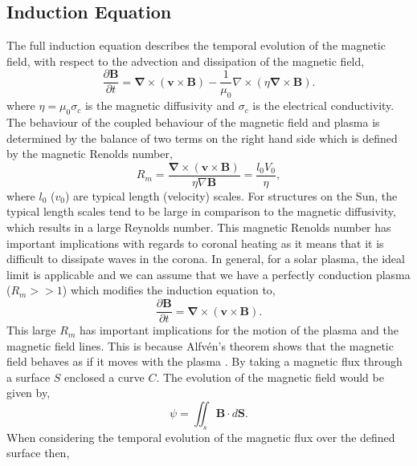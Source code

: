 \documentclass[12pt]{ociamthesis}
\newcommand{\bs}[1]{\boldsymbol{#1}}
\newcommand{\bn}{\boldsymbol{\nabla}}
\begin{document}
\subsection{Induction Equation}
\label{section:cont_eq}
The full induction equation describes the temporal evolution of the magnetic field, with respect to the advection and dissipation of the magnetic field,
\begin{equation}\label{eq89}
\frac{\partial \boldsymbol{B}}{\partial t} = \bn \times (\boldsymbol{v} \times \boldsymbol{B}) - \frac{1}{\mu_0} \nabla \times (\eta \bn \times \boldsymbol{B}).
\end{equation}
where $\eta= \mu_0 \sigma_c$ is the magnetic diffusivity and $\sigma_c$ is the electrical conductivity. The behaviour of the coupled behaviour of the magnetic field and plasma is determined by the balance of two terms on the right hand side which is defined by the magnetic Renolds number,
\begin{equation}
    R_m = \frac{\bn \times (\boldsymbol{v} \times \boldsymbol{B})}{\eta \nabla \bs{B}}=\frac{l_0 V_0}{\eta},
\end{equation}
where $l_0$ ($v_0$) are typical length (velocity) scales. For structures on the Sun, the typical length scales tend to be large in comparison to the magnetic diffusivity, which results in a large Reynolds number. This magnetic Renolds number has important implications with regards to coronal heating as it means that it is difficult to dissipate waves in the corona. In general, for a solar plasma, the ideal limit is applicable and we can assume that we have a perfectly conduction plasma ($R_m>>1$) which modifies the induction equation to,
\begin{equation}\label{perf_induct}
\frac{\partial \boldsymbol{B}}{\partial t} = \bn \times (\boldsymbol{v} \times \boldsymbol{B}).
\end{equation}
This large $R_m$ has important implications for the motion of the plasma and the magnetic field lines. This is because Alfv\'{e}n's theorem shows that the magnetic field behaves as if it moves with the plasma \citep{priest2014magnetohydrodynamics}. By taking a magnetic flux through a surface $S$ enclosed a curve $C$. The evolution of the magnetic field would be given by,
\begin{equation}
    \psi = \iint_s \bs{B} \cdot d\bs{S}.
\end{equation}
When considering the temporal evolution of the magnetic flux over the defined surface then,
\end{document}
